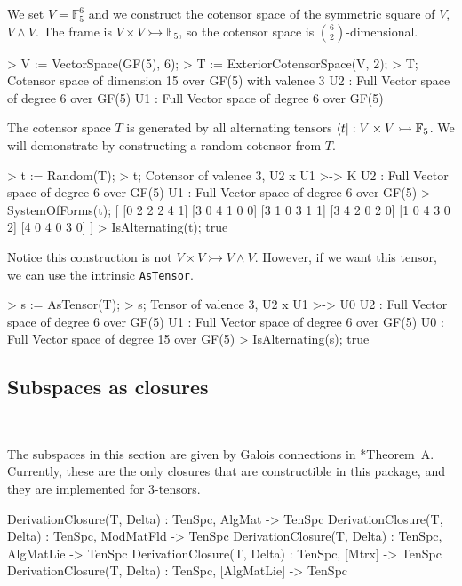 \begin{example}[StandardCoTenSubspcs]

We set $V=\mathbb{F}_5^6$ and we construct the cotensor space of the symmetric square of $V$, $V\wedge V$. 
The frame is $V\times V\rightarrowtail \mathbb{F}_5$, so the cotensor space is $\binom{6}{2}$-dimensional. 
\begin{code}
> V := VectorSpace(GF(5), 6);
> T := ExteriorCotensorSpace(V, 2);
> T;
Cotensor space of dimension 15 over GF(5) with valence 3
U2 : Full Vector space of degree 6 over GF(5)
U1 : Full Vector space of degree 6 over GF(5)
\end{code}

The cotensor space $T$ is generated by all alternating tensors $\langle t| : V\times V\rightarrowtail \mathbb{F}_5$.
We will demonstrate by constructing a random cotensor from $T$. 
\begin{code}
> t := Random(T);
> t;
Cotensor of valence 3, U2 x U1 >-> K
U2 : Full Vector space of degree 6 over GF(5)
U1 : Full Vector space of degree 6 over GF(5)
> SystemOfForms(t);
[
    [0 2 2 2 4 1]
    [3 0 4 1 0 0]
    [3 1 0 3 1 1]
    [3 4 2 0 2 0]
    [1 0 4 3 0 2]
    [4 0 4 0 3 0]
]
> IsAlternating(t);
true
\end{code}

Notice this construction is not $V\times V\rightarrowtail V\wedge V$. 
However, if we want this tensor, we can use the intrinsic \texttt{AsTensor}.
\begin{code}
> s := AsTensor(T);
> s;
Tensor of valence 3, U2 x U1 >-> U0
U2 : Full Vector space of degree 6 over GF(5)
U1 : Full Vector space of degree 6 over GF(5)
U0 : Full Vector space of degree 15 over GF(5)
> IsAlternating(s);
true
\end{code}
\end{example}


\subsection{Subspaces as closures}~

The subspaces in this section are given by Galois connections in \cite{FMW:densors}*{Theorem~A}. 
Currently, these are the only closures that are constructible in this package, and they are implemented for 3-tensors.

\begin{intrinsics}
DerivationClosure(T, Delta) : TenSpc, AlgMat -> TenSpc
DerivationClosure(T, Delta) : TenSpc, ModMatFld -> TenSpc
DerivationClosure(T, Delta) : TenSpc, AlgMatLie -> TenSpc
DerivationClosure(T, Delta) : TenSpc, [Mtrx] -> TenSpc
DerivationClosure(T, Delta) : TenSpc, [AlgMatLie] -> TenSpc
\end{intrinsics}

